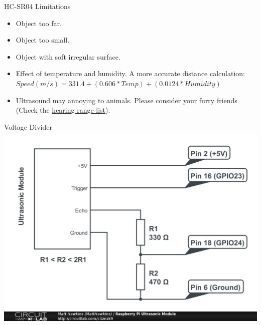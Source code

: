 \documentclass[12pt,letterpaper]{beamer}
\begin{document}
\begin{frame}{HC-SR04 Limitations}

    {\small
        \begin{itemize}
            \item Object too far.
            \item Object too small.
            \item Object with soft irregular surface.
            \item Effect of temperature and humidity. A more accurate distance calculation: $Speed(m/s) = 331.4 + (0.606 * Temp) + (0.0124 * Humidity)$
            \item Ultrasound may annoying to animals. Please consider your furry friends (Check the \href{https://en.wikipedia.org/wiki/Hearing_range}{hearing range list}).
        \end{itemize}
    }
\end{frame}

\begin{frame}{Voltage Divider}
    \includegraphics[width=.95\linewidth]{voltage_divider}
\end{frame}
\end{document}
